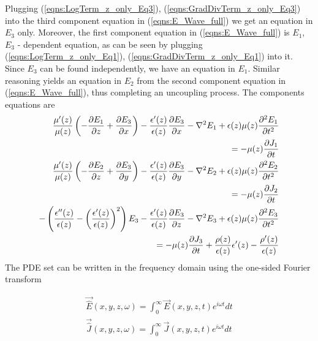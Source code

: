 \documentclass[12pt,twoside]{report}
\begin{document}
Plugging (\ref{eqns:LogTerm_z_only_Eq3}), (\ref{eqns:GradDivTerm_z_only_Eq3}) into the third component equation in (\ref{eqns:E_Wave_full}) we get an equation in $E_3$ only. Moreover, the first component equation in (\ref{eqns:E_Wave_full}) is $E_1$, $E_3$ - dependent equation, as can be seen by plugging (\ref{eqns:LogTerm_z_only_Eq1}), (\ref{eqns:GradDivTerm_z_only_Eq1}) into it. Since $E_3$ can be found independently, we have an equation in $E_1$. Similar reasoning yields an equation in $E_2$ from the second component equation in (\ref{eqns:E_Wave_full}), thus completing an uncoupling process. The components equations are
\begin{subequations}
\begin{align}
\label{eqns:Generalized_wave_z_coeffs_Eq1}
\dfrac{\mu'(z)}{\mu(z)}\left( -\dfrac{\partial E_1}{\partial z} + \dfrac{\partial E_3}{\partial x}\right)-\dfrac{\epsilon'(z)}{\epsilon(z)}\dfrac{\partial E_3}{\partial x}-\nabla^2 E_1 +\epsilon(z) \mu(z)\dfrac{\partial^2 E_1}{\partial t^2} &\\ 
=-\mu(z)\dfrac{\partial J_1}{\partial t} \notag\\
\label{eqns:Generalized_wave_z_coeffs_Eq2}
\dfrac{\mu'(z)}{\mu(z)}\left( -\dfrac{\partial E_2}{\partial z} + \dfrac{\partial E_3}{\partial y}\right)-\dfrac{\epsilon'(z)}{\epsilon(z)}\dfrac{\partial E_3}{\partial y}-\nabla^2 E_2 + \epsilon(z) \mu(z)\dfrac{\partial^2 E_2}{\partial t^2} &\\
= -\mu(z)\dfrac{\partial J_2}{\partial t} \notag\\
\label{eqns:Generalized_wave_z_coeffs_Eq3}	
-\left( \dfrac{\epsilon''(z)}{\epsilon(z)}-\left( \dfrac{\epsilon'(z)}{\epsilon(z)}\right)^2 \right)E_3 -\dfrac{\epsilon'(z)}{\epsilon(z)}\dfrac{\partial E_3}{\partial z} - \nabla^2 E_3 +\epsilon(z) \mu(z)\dfrac{\partial^2 E_3}{\partial t^2} &\\
= -\mu(z)\dfrac{\partial J_3}{\partial t} + \dfrac{\rho(z)}{\epsilon(z)}\epsilon'(z) - \dfrac{\rho'(z)}{\epsilon(z)} \notag 
\end{align}
\end{subequations}
The PDE set can be written in the frequency domain using the one-sided Fourier transform

\begin{subequations}
\begin{align}
\label{eqns:time-harmonic-E-field-trasns}
 \overrightarrow{\hat{E}}(x,y,z,\omega) = \int_0^\infty \overrightarrow{E}(x,y,z,t)e^{i \omega t}dt\\
\label{eqns:time-harmonic-J-current-trasns}
  \overrightarrow{\hat{J}}(x,y,z,\omega) = \int_0^\infty \overrightarrow{J}(x,y,z,t)e^{i \omega t}dt
\end{align}
\end{subequations}
\end{document}
